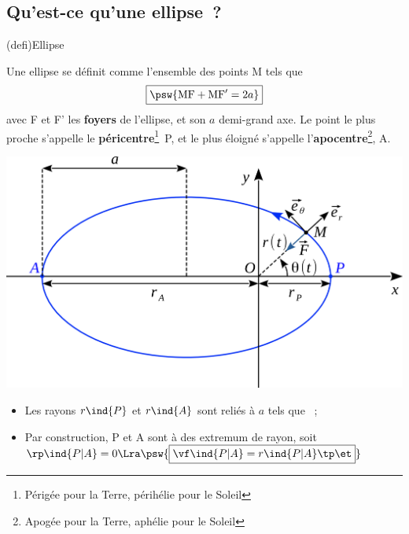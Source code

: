 \documentclass[../../main/main.tex]{subfiles}
\begin{document}
\subsection{Qu'est-ce qu'une ellipse~?}
\begin{tcb*}(defi){Ellipse}
	\begin{isd}[righthand ratio=.45]
		Une ellipse se définit comme l'ensemble des points M tels que
		\[\boxed{\psw{{\rm MF}+{\rm MF'} = 2a}}\]
		avec F et F' les \textbf{foyers} de l'ellipse, et son $a$ demi-grand axe.
		\smallbreak
		Le point le plus proche s'appelle le \textbf{péricentre}\footnote{Périgée
			pour la Terre, périhélie pour le Soleil}~P, et le plus éloigné
		s'appelle l'\textbf{apocentre}\footnote{Apogée pour la Terre, aphélie pour
			le Soleil}, A.
		\tcblower
		\begin{center}
			\includegraphics[width=\linewidth]{ell_def}
		\end{center}
	\end{isd}
	\begin{itemize}
		\item Les rayons $r\ind{P}$ et $r\ind{A}$ sont reliés à $a$ tels que
		      ~;
		      \vspace{-10pt}
		\item Par construction, P et A sont à des extremum de rayon, soit
		      $\rp\ind{P|A} = 0 \Lra \psw{\boxed{\vf\ind{P|A} = r\ind{P|A}\tp \et}}$
	\end{itemize}
\end{tcb*}
\end{document}
